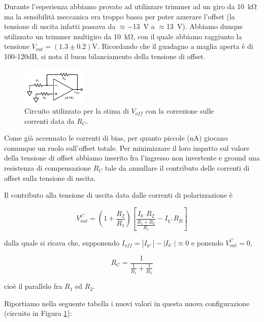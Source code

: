 Durante l'esperienza abbiamo provato ad utilizzare trimmer ad un giro da \SI{10}{\kilo\ohm} ma la sensibilità meccanica era troppo bassa per poter azzerare l'offset (la tensione di uscita infatti passava da $\approx$\SI{-13}{\volt} a $\approx$\SI{+13}{\volt}). Abbiamo dunque utilizzato un trimmer multigiro da \SI{10}{\kilo\ohm}, con il quale abbiamo raggiunto la tensione $V_{out}= (1.3\pm0.2)\si{\volt}$. Ricordando che il guadagno a maglia aperta è di 100-120dB, si nota il buon bilanciamento della tensione di offset.

\begin{figure}
  \begin{center}
    \includegraphics[width=0.280\textwidth]{../E02/latex/current_correction.pdf}
  \end{center}
  \caption{Circuito utilizzato per la stima di $V_{off}$ con la correzione sulle correnti data da $R_C$.}
  \label{cir2:current_correction}
\end{figure}

Come già accennato le correnti di bias, per quanto piccole (\si{\nano\ampere}) giocano comunque un ruolo sull'offset totale. Per minimizzare il loro impatto sul valore della tensione di offset abbiamo inserito fra l'ingresso non invertente e ground una resistenza di compensazione $R_C$ tale da annullare il contributo delle correnti di offset sulla tensione di uscita.

Il contributo alla tensione di uscita data dalle correnti di polarizzazione è

\begin{equation}
V_{out}^{C} = \left( 1+\frac{R_2}{R_1} \right)\left[ \frac{I_{b^-}R_2}{\frac{R_1+R_2}{R_1}} - I_{b^+} R_B\right]
\label{eq2:Vout_currents}
\end{equation}

dalla quale si ricava che, supponendo $I_{off} = |I_{b^+}|-|I_{b^-}| \approx 0$ e ponendo $V_{out}^{C}=0$,

$$R_C=\frac{1}{\frac{1}{R_1} + \frac{1}{R_2}} $$

cioè il parallelo fra $R_1$ ed $R_2$.

Riportiamo nella seguente tabella i nuovi valori in questa nuova configurazione (circuito in Figura \ref{cir2:current_correction}):


